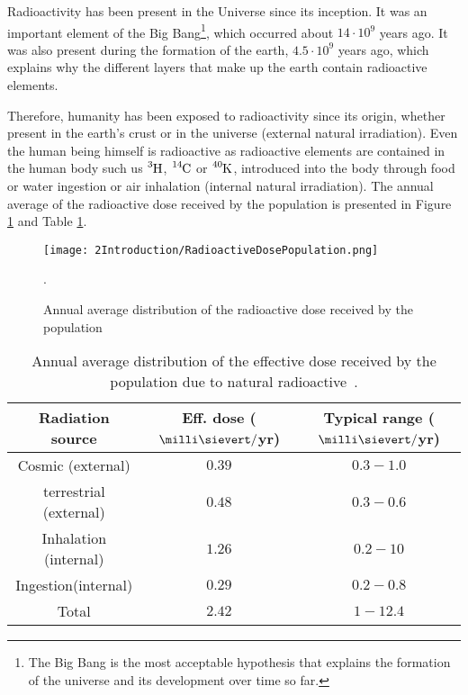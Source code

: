 Radioactivity has been present in the Universe since its inception. It was an important element of the Big Bang\footnote{The Big Bang is the most acceptable hypothesis that explains the formation of the universe and its development over time so far.}, which occurred about $14 \cdot{} 10^9$ years ago. It was also present during the formation of the earth, $4.5 \cdot{} 10^9$ years ago, which explains why the different layers that make up the earth contain radioactive elements. 

Therefore, humanity has been exposed to radioactivity since its origin, whether present in the earth's crust or in the universe (external natural irradiation). Even the human being himself is radioactive as radioactive elements are contained in the human body such us $\ce{^{3}H}$, $\ce{^{14}C}$ or $\ce{^{40}K}$, introduced into the body through food or water ingestion or air inhalation (internal natural irradiation). The annual average of the radioactive dose received by the population is presented in Figure \ref{fig:RadioactiveDosePopulation} and Table \ref{tab:RadioactiveNaturalDosePopulation}.

\begin{figure}[hbtp]
\texttt{[image: 2Introduction/RadioactiveDosePopulation.png]}
\centering
\caption{Annual average distribution of the radioactive dose received by the population~\cite{IAEA}\label{fig:RadioactiveDosePopulation}}.
\end{figure}


\begin{table}[htbp]
\begin{center}
\begin{tabular}{|c|c|c|}
\hline
Radiation source & Eff. dose ($\milli\sievert/$yr) & Typical range ($\milli\sievert/$yr)\\
\hline \hline \hline
Cosmic (external) & $0.39$ & $0.3 - 1.0$ \\ \hline
terrestrial (external) & $0.48$ & $0.3-0.6$ \\ \hline
\hline  
Inhalation (internal) & $1.26$ & $0.2-10$ \\ \hline
Ingestion(internal) & $0.29$ & $0.2-0.8$ \\ \hline
\hline 
Total & $2.42$ & $1-12.4$ \\ \hline
\end{tabular}
\caption{Annual average distribution of the effective dose received by the population due to natural radioactive~\cite{UNSCEAR}\cite{CSN}.}
\label{tab:RadioactiveNaturalDosePopulation}
\end{center}
\end{table}


